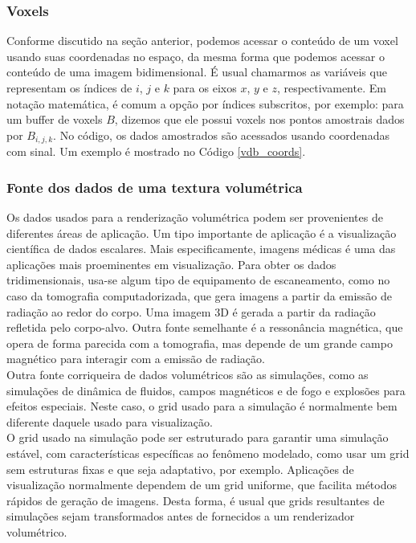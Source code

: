 \documentclass[12pt, a4paper, oneside]{book}
\begin{document}
\subsubsection{Voxels}

Conforme discutido na seção anterior, podemos acessar o conteúdo de um voxel usando suas coordenadas no espaço, da mesma forma que podemos acessar o conteúdo de uma imagem bidimensional. É usual chamarmos as variáveis que representam os índices de $i$, $j$ e $k$ para os eixos $x$, $y$ e $z$, respectivamente. Em notação matemática, é comum a opção por índices subscritos, por exemplo: para um buffer de voxels $B$, dizemos que ele possui voxels nos pontos amostrais dados por $B_{i,j,k}$. No código, os dados amostrados são acessados usando coordenadas com sinal. Um exemplo é mostrado no Código \ref{vdb_coords}.



\subsubsection{Fonte dos dados de uma textura volumétrica}

Os dados usados para a renderização volumétrica podem ser provenientes de diferentes áreas de aplicação. Um tipo importante de aplicação é a visualização científica de dados escalares. Mais especificamente, imagens médicas é uma das aplicações mais proeminentes em visualização. Para obter os dados tridimensionais, usa-se algum tipo de equipamento de escaneamento, como no caso da tomografia computadorizada, que gera imagens a partir da emissão de radiação ao redor do corpo. Uma imagem 3D é gerada a partir da radiação refletida pelo corpo-alvo. Outra fonte semelhante é a ressonância magnética, que opera de forma parecida com a tomografia, mas depende de um grande campo magnético para interagir com a emissão de radiação. \\

Outra fonte corriqueira de dados volumétricos são as simulações, como as simulações de dinâmica de fluidos, campos magnéticos e de fogo e explosões para efeitos especiais. Neste caso, o grid usado para a simulação é normalmente bem diferente daquele usado para visualização.\\

O grid usado na simulação pode ser estruturado para garantir uma simulação estável, com características específicas ao fenômeno modelado, como usar um grid sem estruturas fixas e que seja adaptativo, por exemplo.
Aplicações de visualização normalmente dependem de um grid uniforme, que facilita métodos rápidos de geração de imagens. Desta forma, é usual que grids resultantes de simulações sejam transformados antes de fornecidos a um renderizador volumétrico. 
\end{document}
